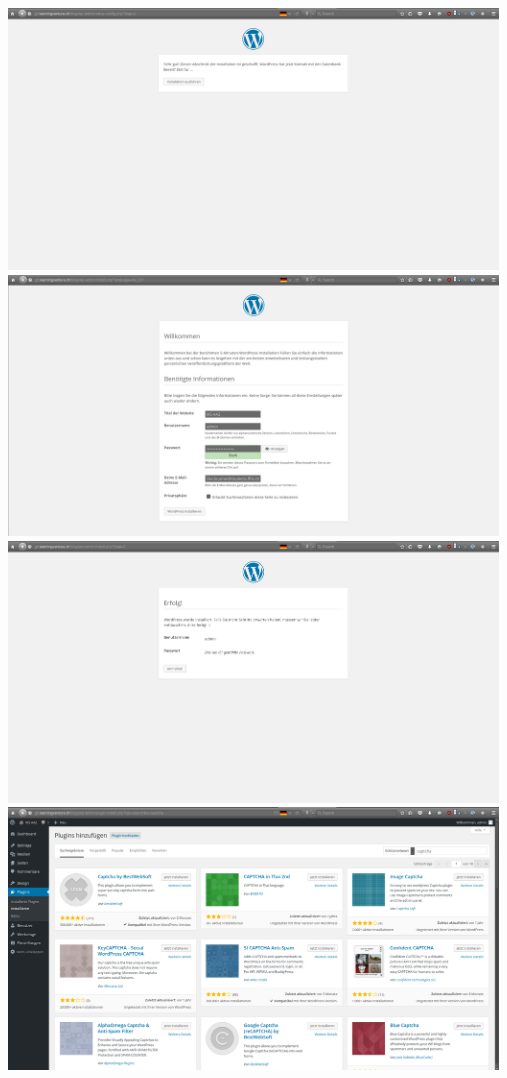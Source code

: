 \documentclass{article}
\begin{document}
	\newline
	\includegraphics[width=13cm]{../Pics/37-wordpress-databas_ok}
	\newline
	\includegraphics[width=13cm]{../Pics/38-wordpress-angaben}
	\newline
	\includegraphics[width=13cm]{../Pics/39-wordpress-install_success}
	\newline
	\includegraphics[width=13cm]{../Pics/40-wordpress-captcha}
\end{document}
